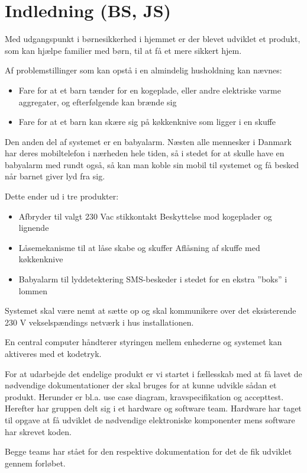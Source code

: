 \chapter{Indledning (BS, JS)}

Med udgangspunkt i børnesikkerhed i hjemmet er der blevet udviklet et produkt, som kan hjælpe familier med børn, til at få et mere sikkert hjem.

Af problemstillinger som kan opstå i en almindelig husholdning kan nævnes:
\begin{itemize}
	\item Fare for at et barn tænder for en kogeplade, eller andre elektriske varme aggregater, og efterfølgende kan brænde sig
	\item Fare for at et barn kan skære sig på køkkenknive som ligger i en skuffe
\end{itemize}

Den anden del af systemet er en babyalarm. Næsten alle mennesker i Danmark har deres mobiltelefon i nærheden hele tiden, så i stedet for at skulle have en babyalarm med rundt også, så kan man koble sin mobil til systemet og få besked når barnet giver lyd fra sig.

Dette ender ud i tre produkter:

\begin{itemize}
\item Afbryder til valgt 230 Vac stikkontakt
\subitem Beskyttelse mod kogeplader og lignende
\item Låsemekanisme til at låse skabe og skuffer
\subitem Aflåsning af skuffe med køkkenknive
\item Babyalarm til lyddetektering
\subitem SMS-beskeder i stedet for en ekstra ''boks'' i lommen
\end{itemize}

Systemet skal være nemt at sætte op og skal kommunikere over det eksisterende 230 V vekselspændings netværk i hus installationen.

En central computer håndterer styringen mellem enhederne og systemet kan aktiveres med et kodetryk.

For at udarbejde det endelige produkt er vi startet i fællesskab med at få lavet de nødvendige dokumentationer der skal bruges for at kunne udvikle sådan et produkt. Herunder er bl.a. use case diagram, kravspecifikation og accepttest. Herefter har gruppen delt sig i et hardware og software team. Hardware har taget til opgave at få udviklet de nødvendige elektroniske komponenter mens software har skrevet koden.

Begge teams har stået for den respektive dokumentation for det de fik udviklet gennem forløbet. 